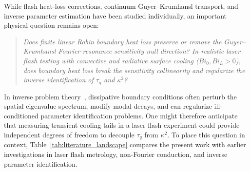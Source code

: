 \documentclass[preprint,12pt]{elsarticle}
\begin{document}
While flash heat-loss corrections, continuum Guyer--Krumhansl transport, and inverse parameter estimation have been studied individually, an important physical question remains open:
\begin{quote}
\textit{Does finite linear Robin boundary heat loss preserve or remove the Guyer--Krumhansl Fourier-resonance sensitivity null direction? In realistic laser flash testing with convective and radiative surface cooling ($Bi_0, Bi_L > 0$), does boundary heat loss break the sensitivity collinearity and regularize the inverse identification of $\tau_q$ and $\kappa^2$?}
\end{quote}
In inverse problem theory~\cite{beck1985inverse,ozisik2000inverse,emery2000uncertainties}, dissipative boundary conditions often perturb the spatial eigenvalue spectrum, modify modal decays, and can regularize ill-conditioned parameter identification problems. One might therefore anticipate that measuring transient cooling tails in a laser flash experiment could provide independent degrees of freedom to decouple $\tau_q$ from $\kappa^2$. To place this question in context, Table~\ref{tab:literature_landscape} compares the present work with earlier investigations in laser flash metrology, non-Fourier conduction, and inverse parameter identification.
\end{document}
